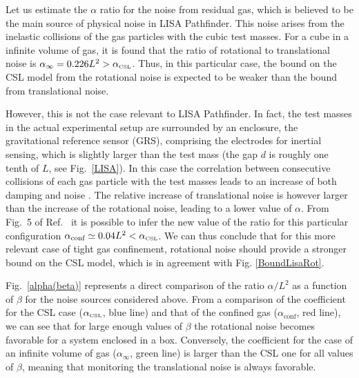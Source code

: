 \documentclass[aps,twocolumn,pra,superscriptaddress]{revtex4-2}
\begin{document}
{{Let us estimate the $\alpha$ ratio for the noise from residual gas, which is believed to be the main source of physical noise in  LISA Pathfinder.} This noise arises from the inelastic collisions of the gas particles with the cubic test masses. 
For a cube in a infinite volume of gas, it is found \cite{cavalleri2010gas} that the ratio of rotational
to {translational} noise is $\alpha_\infty=0.226 L^2>\alpha_{\text{\tiny{CSL}}}$.
Thus, in this particular case, the bound on the CSL model from the rotational noise is expected to be weaker than the bound from translational noise.


However, this is not the case relevant to LISA Pathfinder. In fact, the test masses in the actual experimental setup are surrounded by an enclosure, the gravitational reference sensor (GRS), comprising the electrodes for inertial sensing, which is slightly larger than the test mass (the gap $d$ is roughly one tenth of $L$, see Fig.~\ref{LISA}). In this case the correlation between consecutive collisions of each gas particle with the test masses leads to an increase of both damping and noise \cite{cavalleri2009increased}. The relative increase of {translational} noise is however larger than the increase of the rotational noise, leading to a lower value of $\alpha$.
From Fig.~5 of Ref.~\cite{cavalleri2009increased} it is possible to infer the new value of the ratio for this particular configuration $\alpha_{\text{conf}}\simeq0.04 L^2<\alpha_{\text{\tiny{CSL}}}$.
We can thus conclude that for this more relevant case of tight gas confinement, rotational noise should provide a stronger bound on the CSL model, which is in agreement with Fig. \ref{BoundLisaRot}.

{Fig.~\ref{alpha(beta)} represents a direct comparison of the ratio $\alpha/L^2$ as a function of $\beta$  for the noise sources considered above. From a comparison of the coefficient for the CSL case ($\alpha_{\text{\tiny{CSL}}}$, blue line) and that of the confined gas ($\alpha_{\text{conf}}$, red line), we can see that for large enough values of $\beta$ the rotational noise becomes favorable for a system enclosed in a box. Conversely, the coefficient for the case of an infinite volume of gas   ($\alpha_\infty$, green line) is larger than the CSL one for all values of $\beta$, meaning that monitoring the translational noise is always favorable.} 

}
\end{document}
